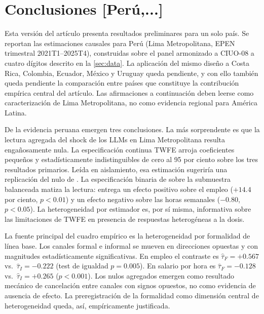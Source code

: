\section{Conclusiones [Per\'{u},...]}
\label{sec:conclusion}

Esta versi\'{o}n del art\'{i}culo presenta resultados preliminares para un solo pa\'{i}s. Se reportan las estimaciones causales para Per\'{u} (Lima Metropolitana, EPEN trimestral 2021T1--2025T4), construidas sobre el panel armonizado a CIUO-08 a cuatro d\'{i}gitos descrito en la \cref{sec:data}. La aplicaci\'{o}n del mismo dise\~{n}o a Costa Rica, Colombia, Ecuador, M\'{e}xico y Uruguay queda pendiente, y con ello tambi\'{e}n queda pendiente la comparaci\'{o}n entre pa\'{i}ses que constituye la contribuci\'{o}n emp\'{i}rica central del art\'{i}culo. Las afirmaciones a continuaci\'{o}n deben leerse como caracterizaci\'{o}n de Lima Metropolitana, no como evidencia regional para Am\'{e}rica Latina.

De la evidencia peruana emergen tres conclusiones. La m\'{a}s sorprendente es que la lectura agregada del shock de los LLMs en Lima Metropolitana resulta enga\~{n}osamente nula. La especificaci\'{o}n continua TWFE arroja coeficientes peque\~{n}os y estad\'{i}sticamente indistinguibles de cero al 95 por ciento sobre los tres resultados primarios. Le\'{i}da en aislamiento, esa estimaci\'{o}n sugerir\'{i}a una replicaci\'{o}n del nulo de \citet{HumlumVestergaard2025_llm}. La especificaci\'{o}n binaria de \citet{CallawayS2021_did} sobre la submuestra balanceada matiza la lectura: entrega un efecto positivo sobre el empleo ($+14.4$ por ciento, $p < 0.01$) y un efecto negativo sobre las horas semanales ($-0.80$, $p < 0.05$). La heterogeneidad por estimador es, por s\'{i} misma, informativa sobre las limitaciones de TWFE en presencia de respuestas heterog\'{e}neas a la dosis.

La fuente principal del cuadro emp\'{i}rico es la heterogeneidad por formalidad de l\'{i}nea base. Los canales formal e informal se mueven en direcciones opuestas y con magnitudes estad\'{i}sticamente significativas. En empleo el contraste es $\hat\tau_F = +0.567$ vs.\ $\hat\tau_I = -0.222$ (test de igualdad $p = 0.005$). En salario por hora es $\hat\tau_F = -0.128$ vs.\ $\hat\tau_I = +0.265$ ($p < 0.001$). Los nulos agregados emergen como resultado mec\'{a}nico de cancelaci\'{o}n entre canales con signos opuestos, no como evidencia de ausencia de efecto. La preregistraci\'{o}n de la formalidad como dimensi\'{o}n central de heterogeneidad queda, as\'{i}, emp\'{i}ricamente justificada.

